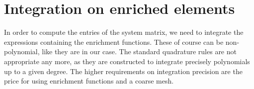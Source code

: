 \documentclass[preprint,12pt]{elsarticle}
\begin{document}
% 
% 


\section{Integration on enriched elements}
\label{sec:integration}
In order to compute the entries of the system matrix, %
we need to integrate
the expressions containing the enrichment functions. These of course can be non-polynomial, like they are 
in our case. The standard quadrature rules are not appropriate any more, as they are constructed to integrate 
precisely polynomials up to a given degree. The higher requirements on integration precision
are the price for using enrichment functions and a coarse mesh.
\end{document}
